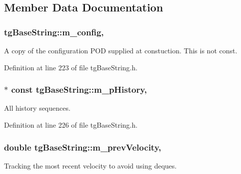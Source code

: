 \subsection{Member Data Documentation}
\hypertarget{classtg_base_string_ac13cae3d6eb82d20b182be6aaa5e4fe0}{
\subsubsection[{m\-\_\-config}]{ tg\-Base\-String\-::m\-\_\-config\hspace{0.3cm}{\ttfamily [protected]}, {\ttfamily [inherited]}}}\label{classtg_base_string_ac13cae3d6eb82d20b182be6aaa5e4fe0}
A copy of the configuration P\-O\-D supplied at constuction. This is not const. 

Definition at line 223 of file tg\-Base\-String.\-h.

\hypertarget{classtg_base_string_ab50177e75064ed5863e497cad34df60a}{
\subsubsection[{m\-\_\-p\-History}]{$\ast$ const tg\-Base\-String\-::m\-\_\-p\-History\hspace{0.3cm}{\ttfamily [protected]}, {\ttfamily [inherited]}}}\label{classtg_base_string_ab50177e75064ed5863e497cad34df60a}
All history sequences. 

Definition at line 226 of file tg\-Base\-String.\-h.

\hypertarget{classtg_base_string_af54d1188ce7eb296b3b1df2224286424}{
\subsubsection[{m\-\_\-prev\-Velocity}]{\setlength{\rightskip}{0pt plus 5cm}double tg\-Base\-String\-::m\-\_\-prev\-Velocity\hspace{0.3cm}{\ttfamily [protected]}, {\ttfamily [inherited]}}}\label{classtg_base_string_af54d1188ce7eb296b3b1df2224286424}
Tracking the most recent velocity to avoid using deques. 

